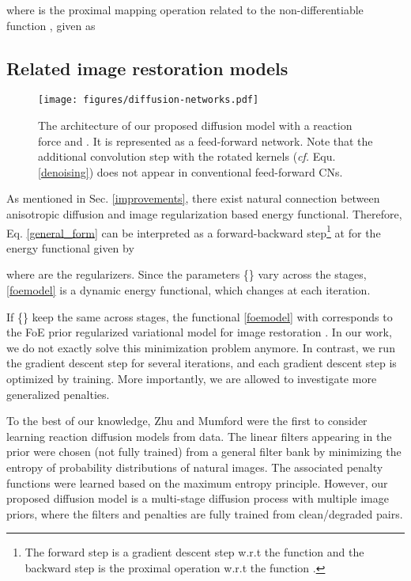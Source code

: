 \documentclass[10pt,journal,compsoc]{IEEEtran}
\begin{document}
{where  
is the proximal mapping operation \cite{ipiano} related to 
the non-differentiable function , given as 


\vspace*{-0.5cm}
\subsection{Related image restoration models}\label{relations}
\begin{figure*}[htb!]
\centering
\vspace{-0.5cm}
\hspace*{-0.9cm} {\texttt{[image: figures/diffusion-networks.pdf]}}
\vspace*{-1.2cm}
\caption{The architecture of our proposed diffusion model with a reaction 
force  and . 
It is represented as a feed-forward network. Note that the additional convolution step with the rotated kernels 
(\textit{cf.} Equ. \ref{denoising}) does not appear in conventional feed-forward CNs. }\label{fig:feedforwardCNN}
\end{figure*}
As mentioned in Sec. \ref{improvements},  
there exist natural connection between anisotropic diffusion and 
image regularization based energy functional. Therefore, Eq. \eqref{general_form}
can be interpreted as a forward-backward step\footnote{
The forward step is a gradient descent step w.r.t the function  
and the backward step is the proximal operation w.r.t the function .} 
\cite{lions1979splitting} at
 for the energy functional given by

where  are the regularizers. 
Since the parameters \{\} vary across the stages, \eqref{foemodel} is a dynamic energy
functional, which changes at each iteration.

If \{\} keep the same across stages, 
the functional \eqref{foemodel} with  corresponds to 
the FoE prior regularized variational model for image
restoration \cite{RothFOE2009, ChenRP14, ChenPRB13}.  In our work, we
do not exactly solve this minimization problem anymore. In
contrast, we run the gradient descent step for several iterations, and
each gradient descent step is optimized by training. 
More importantly, we are allowed to investigate more generalized penalties. 

To the best of our knowledge, Zhu and Mumford \cite{zhu1997prior} were
the first to consider learning reaction diffusion models from data. The linear filters appearing in the prior 
were chosen (not fully trained) from a general filter bank by minimizing the entropy 
of probability distributions of natural images. The associated penalty functions were learned based on the maximum entropy principle. 
However, our proposed diffusion model is a multi-stage diffusion process with 
multiple image priors, where the filters and penalties are fully trained from clean/degraded pairs. 

}
\end{document}
